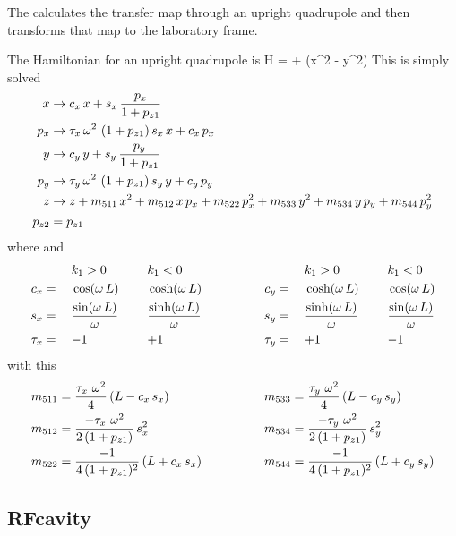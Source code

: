 \documentclass{book}
\begin{document}
The  calculates the transfer map through an upright
quadrupole and then transforms that map to the laboratory frame.

The Hamiltonian for an upright quadrupole is
\Begineq
  H =  +  (x^2 - y^2)
\Endeq
This is simply solved
\begin{align}
  x   &\rightarrow c_x \, x + s_x \, \frac{p_x}{1 + p_{z1}} \nonumber \\
  p_x &\rightarrow \tau_x \, \omega^2 \, \, (1 + p_{z1}) \, s_x \, x + c_x \, p_x \nonumber \\
  y   &\rightarrow c_y \, y + s_y \, \frac{p_y}{1 + p_{z1}} \nonumber \\
  p_y &\rightarrow \tau_y \, \omega^2 \, \, (1 + p_{z1}) \, s_y \, y + c_y \, p_y \nonumber \\
  z   &\rightarrow z + m_{511} \, x^2 + m_{512} \, x \, p_x + m_{522} \, p_x^2 + 
                   m_{533} \, y^2 + m_{534} \, y \, p_y + m_{544} \, p_y^2 \nonumber \\
  p_{z2} &= p_{z1} \nonumber
\end{align}
where 
\Begineq
  \om \equiv {}
\Endeq
and
\begin{alignat}{6}
         &\hspace*{3ex}  && k_1 > 0          &\hspace*{3ex}& k_1 < 0 & \qquad \qquad
         &\hspace*{3ex}  && k_1 > 0          &\hspace*{3ex}& k_1 < 0 \nonumber \\
     c_x &=   && \cos  (\omega \, L) && \cosh (\omega \, L) & \qquad \qquad
     c_y &=   && \cosh (\omega \, L) && \cos  (\omega \, L) \nonumber \\
     s_x &=   && \frac{\sin  (\omega \, L)}{\omega} && \frac{\sinh (\omega \, L)}{\omega} & \qquad \qquad
     s_y &=   && \frac{\sinh (\omega \, L)}{\omega} && \frac{\sin  (\omega \, L)}{\omega} \\
  \tau_x &=   && {-}1             && {+}1             & \qquad \qquad
  \tau_y &=   && {+}1             && {-}1             \nonumber
\end{alignat}
with this
\begin{alignat}{2}
  m_{511} &= \frac{\tau_x \,\, \omega^2}{4} \, (L - c_x \, s_x) & \qquad \qquad
  m_{533} &= \frac{\tau_y \,\, \omega^2}{4} \, (L - c_y \, s_y) \nonumber \\
  m_{512} &= \frac{-\tau_x \,\, \omega^2}{2 \, (1 + p_{z1})} \, s_x^2 & \qquad \qquad
  m_{534} &= \frac{-\tau_y \,\, \omega^2}{2 \, (1 + p_{z1})} \, s_y^2 \nonumber \\
  m_{522} &= \frac{-1}{4 \, (1 + p_{z1})^2} \, (L + c_x \, s_x) & \qquad \qquad
  m_{544} &= \frac{-1}{4 \, (1 + p_{z1})^2} \, (L + c_y \, s_y) \nonumber
\end{alignat}


\subsection{RFcavity}
\end{document}
